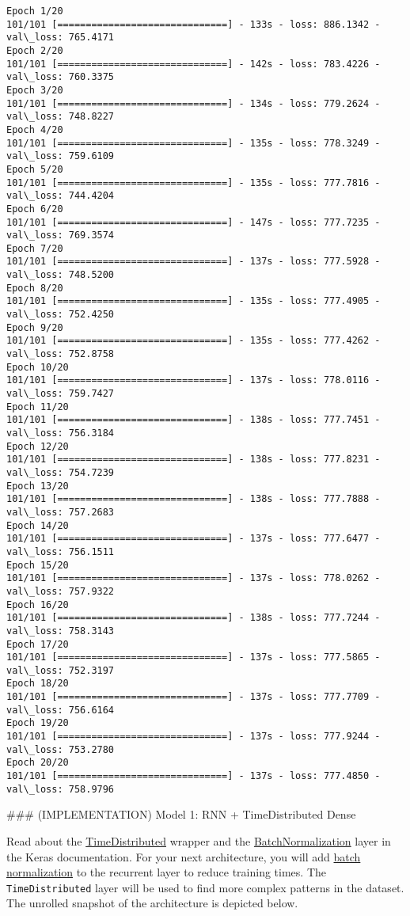 \documentclass[11pt]{article}
\begin{document}
    \begin{Verbatim}[commandchars=\\\{\}]
Epoch 1/20
101/101 [==============================] - 133s - loss: 886.1342 - val\_loss: 765.4171
Epoch 2/20
101/101 [==============================] - 142s - loss: 783.4226 - val\_loss: 760.3375
Epoch 3/20
101/101 [==============================] - 134s - loss: 779.2624 - val\_loss: 748.8227
Epoch 4/20
101/101 [==============================] - 135s - loss: 778.3249 - val\_loss: 759.6109
Epoch 5/20
101/101 [==============================] - 135s - loss: 777.7816 - val\_loss: 744.4204
Epoch 6/20
101/101 [==============================] - 147s - loss: 777.7235 - val\_loss: 769.3574
Epoch 7/20
101/101 [==============================] - 137s - loss: 777.5928 - val\_loss: 748.5200
Epoch 8/20
101/101 [==============================] - 135s - loss: 777.4905 - val\_loss: 752.4250
Epoch 9/20
101/101 [==============================] - 135s - loss: 777.4262 - val\_loss: 752.8758
Epoch 10/20
101/101 [==============================] - 137s - loss: 778.0116 - val\_loss: 759.7427
Epoch 11/20
101/101 [==============================] - 138s - loss: 777.7451 - val\_loss: 756.3184
Epoch 12/20
101/101 [==============================] - 138s - loss: 777.8231 - val\_loss: 754.7239
Epoch 13/20
101/101 [==============================] - 138s - loss: 777.7888 - val\_loss: 757.2683
Epoch 14/20
101/101 [==============================] - 137s - loss: 777.6477 - val\_loss: 756.1511
Epoch 15/20
101/101 [==============================] - 137s - loss: 778.0262 - val\_loss: 757.9322
Epoch 16/20
101/101 [==============================] - 138s - loss: 777.7244 - val\_loss: 758.3143
Epoch 17/20
101/101 [==============================] - 137s - loss: 777.5865 - val\_loss: 752.3197
Epoch 18/20
101/101 [==============================] - 137s - loss: 777.7709 - val\_loss: 756.6164
Epoch 19/20
101/101 [==============================] - 137s - loss: 777.9244 - val\_loss: 753.2780
Epoch 20/20
101/101 [==============================] - 137s - loss: 777.4850 - val\_loss: 758.9796

    \end{Verbatim}

     \#\#\# (IMPLEMENTATION) Model 1: RNN + TimeDistributed Dense

Read about the \href{https://keras.io/layers/wrappers/}{TimeDistributed}
wrapper and the
\href{https://keras.io/layers/normalization/}{BatchNormalization} layer
in the Keras documentation. For your next architecture, you will add
\href{https://arxiv.org/pdf/1510.01378.pdf}{batch normalization} to the
recurrent layer to reduce training times. The \texttt{TimeDistributed}
layer will be used to find more complex patterns in the dataset. The
unrolled snapshot of the architecture is depicted below.
\end{document}
